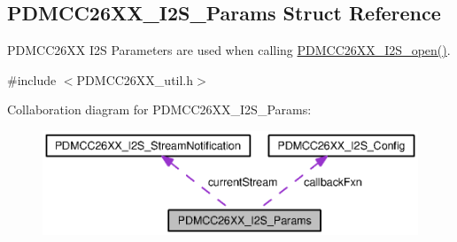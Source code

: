 \subsection{P\+D\+M\+C\+C26\+X\+X\+\_\+\+I2\+S\+\_\+\+Params Struct Reference}
\label{struct_p_d_m_c_c26_x_x___i2_s___params}


P\+D\+M\+C\+C26\+X\+X I2\+S Parameters are used when calling \hyperlink{_p_d_m_c_c26_x_x__util_8h_a8168bcdab9f1e46c26823555df6f797f}{P\+D\+M\+C\+C26\+X\+X\+\_\+\+I2\+S\+\_\+open()}.  




{\ttfamily \#include $<$P\+D\+M\+C\+C26\+X\+X\+\_\+util.\+h$>$}



Collaboration diagram for P\+D\+M\+C\+C26\+X\+X\+\_\+\+I2\+S\+\_\+\+Params\+:
\nopagebreak
\begin{figure}[H]
\begin{center}
\leavevmode
\includegraphics[width=350pt]{struct_p_d_m_c_c26_x_x___i2_s___params__coll__graph}
\end{center}
\end{figure}
